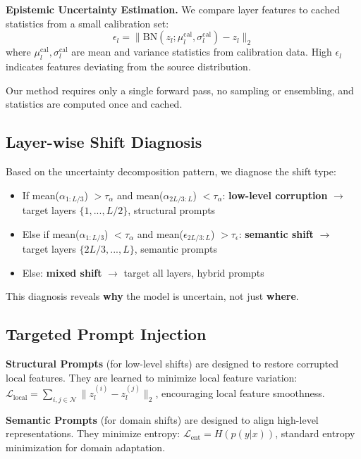 \documentclass[11pt,a4paper]{article}
\begin{document}
\textbf{Epistemic Uncertainty Estimation.} We compare layer features to cached statistics from a small calibration set:
\begin{equation}
\epsilon_l = \|\text{BN}(z_l; \mu_l^{\text{cal}}, \sigma_l^{\text{cal}}) - z_l\|_2
\end{equation}
where $\mu_l^{\text{cal}}, \sigma_l^{\text{cal}}$ are mean and variance statistics from calibration data. High $\epsilon_l$ indicates features deviating from the source distribution.

Our method requires only a single forward pass, no sampling or ensembling, and statistics are computed once and cached.

\subsection{Layer-wise Shift Diagnosis}

Based on the uncertainty decomposition pattern, we diagnose the shift type:
\begin{itemize}
    \item If mean($\alpha_{1:L/3}$) $> \tau_\alpha$ and mean($\alpha_{2L/3:L}$) $< \tau_\alpha$: \textbf{low-level corruption} $\rightarrow$ target layers $\{1, ..., L/2\}$, structural prompts
    \item Else if mean($\alpha_{1:L/3}$) $< \tau_\alpha$ and mean($\epsilon_{2L/3:L}$) $> \tau_\epsilon$: \textbf{semantic shift} $\rightarrow$ target layers $\{2L/3, ..., L\}$, semantic prompts
    \item Else: \textbf{mixed shift} $\rightarrow$ target all layers, hybrid prompts
\end{itemize}
This diagnosis reveals \textbf{why} the model is uncertain, not just \textbf{where}.

\subsection{Targeted Prompt Injection}

\textbf{Structural Prompts} (for low-level shifts) are designed to restore corrupted local features. They are learned to minimize local feature variation: $\mathcal{L}_{\text{local}} = \sum_{i,j \in \mathcal{N}} \|z_l^{(i)} - z_l^{(j)}\|_2$, encouraging local feature smoothness.

\textbf{Semantic Prompts} (for domain shifts) are designed to align high-level representations. They minimize entropy: $\mathcal{L}_{\text{ent}} = H(p(y|x))$, standard entropy minimization for domain adaptation.
\end{document}
